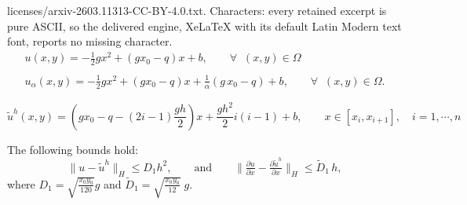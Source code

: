 \documentclass[10pt,a4paper]{amsart}
\newcommand\pder[2][]{\ensuremath{\tfrac{\partial#1}{\partial#2}}}
\begin{document}
licenses/arxiv-2603.11313-CC-BY-4.0.txt. Characters: every retained excerpt is pure ASCII, so the delivered engine, XeLaTeX with its default Latin Modern text font, reports no missing character.
\begin{equation}\label{Def: u y ualpha}
\begin{array}{ll}
 u (x, y) = -\tfrac{1}{2} g x^2 + (g x_0 - q) x +b, \qquad \forall \;\; (x,y) \in \Omega   \\ 
 \\
 u_\alpha (x, y)= -\tfrac{1}{2} g x^2 + (g x_0 - q) x + \tfrac{1}{\alpha} (g\,x_0 - q) +b ,\qquad \forall \;\; (x,y) \in \Omega. 
 \end{array}
 \end{equation}

\begin{equation}\label{uhtilde}
{\widetilde{u}^h}(x,y)=\left(gx_0-q-(2i-1)\frac{gh}{2} \right)x+\frac{gh^2}{2} i (i-1)+b,\qquad x\in [x_i,x_{i+1}], \quad i=1,\cdots,n
\end{equation}

  \begin{Lemma} \label{Cota u uh tilde} The following  bounds hold:
    		\[\lVert u-{\widetilde{u}^h} \rVert _H \leq  D_1 h^2, \qquad \text{and}\qquad
\lVert \pder[u]{x}-\pder[{\widetilde{u}^h}]{x} \rVert _H \leq \widetilde{D}_{1}\, h, \]
    		where $D_1=\sqrt{\frac{x_0 y_0 }{120}} g $ 
   and $\widetilde{D}_1=\sqrt{\frac{x_0 y_0}{12}}\; g$.
    
    \end{Lemma}
\end{document}
